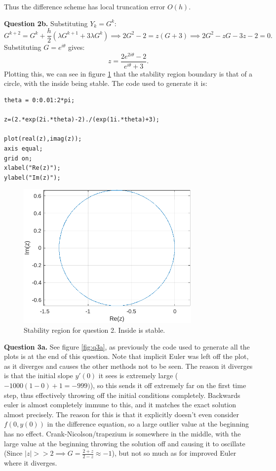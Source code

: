 \documentclass[letterpaper, reqno,11pt]{article}
\begin{document}
Thus the difference scheme has local truncation error $O(h)$.

{\medskip\noindent\bf Question 2b.} Substituting $Y_k=G^{k}$:
\[
G^{k+2}=G^{k}+\frac{h}{2}\left( \lambda G^{k+1}+3\lambda G^{k} \right) \implies 2G^2-2=z(G+3)\implies 2G^2-zG-3z-2=0
.\]
Substituting $G=e^{i\theta}$ gives:
\[
z=\frac{2e^{2i\theta}-2}{e^{i\theta}+3}
.\]
Plotting this, we can see in figure \ref{fig:q2b} that the stability region boundary is that of a circle, with the inside being stable. The code used to generate it is:
\begin{lstlisting}
theta = 0:0.01:2*pi;

z=(2.*exp(2i.*theta)-2)./(exp(1i.*theta)+3);

plot(real(z),imag(z));
axis equal;
grid on;
xlabel("Re(z)");
ylabel("Im(z)");
\end{lstlisting}

\begin{figure}[htpb]
    \centering
    \includegraphics[width=0.8\textwidth]{q2b}
    \caption{Stability region for question 2. Inside is stable.}
    \label{fig:q2b}
\end{figure}

{\medskip\noindent\bf Question 3a.} See figure \ref{fig:q3a}, as previously the code used to generate all the plots is at the end of this question. Note that implicit Euler was left off the plot, as it diverges and causes the other methods not to be seen. The reason it diverges is that the initial slope $y'(0)$ it sees is extremely large ($-1000(1-0)+1=-999)$), so this sends it off extremely far on the first time step, thus effectively throwing off the initial conditions completely. Backwards euler is almost completely immune to this, and it matches the exact solution almost precisely. The reason for this is that it explicitly doesn't even consider $f(0,y(0))$ in the difference equation, so a large outlier value at the beginning has no effect. Crank-Nicolson/trapezium is somewhere in the middle, with the large value at the beginning throwing the solution off and causing it to oscillate (Since $|z|> >2\implies G=\frac{2+z}{2-z}\approx -1$), but not so much as for improved Euler where it diverges.
\end{document}
